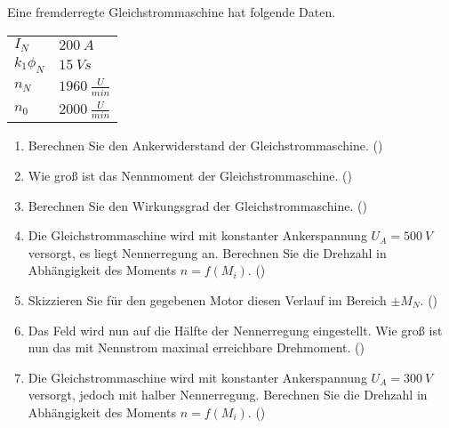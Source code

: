 \begin{question}[section=2,name={3.12.2013},mode=exm,type=bsp,tags={20131203}]
Eine fremderregte Gleichstrommaschine hat folgende Daten.\\
\begin{tabular}{L{2cm}l}
$I_{N}$ \dotfill &$200~A$\\
$k_1 \phi_N$ \dotfill & $15~Vs$ \\
$n_N$ \dotfill & $1960~\frac{U}{min}$\\
$n_0$ \dotfill & $2000~\frac{U}{min}$
\end{tabular}
\begin{enumerate}
\item Berechnen Sie den Ankerwiderstand der Gleichstrommaschine. ()
\item Wie groß ist das Nennmoment der Gleichstrommaschine. ()
\item Berechnen Sie den Wirkungsgrad der Gleichstrommaschine. ()
\item Die Gleichstrommaschine wird mit konstanter Ankerspannung $U_A = 500~V$ versorgt, es liegt Nennerregung an. Berechnen Sie die Drehzahl in Abhängigkeit des Moments $n=f(M_i)$. ()
\item Skizzieren Sie für den gegebenen Motor diesen Verlauf im Bereich $\pm M_N$. ()
\item Das Feld wird nun auf die Hälfte der Nennerregung eingestellt. Wie groß ist nun das mit Nennstrom maximal erreichbare Drehmoment. ()
\item Die Gleichstrommaschine wird mit konstanter Ankerspannung $U_A = 300~V$ versorgt, jedoch mit halber Nennerregung. Berechnen Sie die Drehzahl in Abhängigkeit des Moments $n=f(M_i)$. ()
\end{enumerate}
\end{question}
